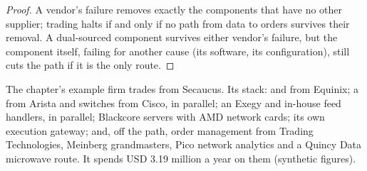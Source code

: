 \begin{proof}
A vendor's failure removes exactly the components that have no other supplier; trading halts if and only if no path from data to
orders survives their removal. A dual-sourced component survives either vendor's failure, but the component itself, failing for
another cause (its software, its configuration), still cuts the path if it is the only route.
\end{proof}

The chapter's example firm trades from Secaucus. Its stack:  and  from Equinix; a  from Arista
and switches from Cisco, in parallel; an Exegy  and in-house feed handlers, in parallel; Blackcore servers with AMD network
cards; its own execution gateway; and, off the path, order management from Trading Technologies, Meinberg grandmasters, Pico network
analytics and a Quincy Data microwave route. It spends USD 3.19 million a year on them (synthetic figures).

